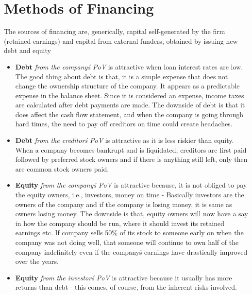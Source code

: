 \section{Methods of Financing}
The sources of financing are, generically, capital self-generated by the firm (retained earnings) and capital from external funders, obtained by issuing new debt and equity
	\begin{itemize}
	\item \textbf{Debt} \textit{from the company\'s PoV} is attractive when loan interest rates are low. The good thing about debt is that, it is a simple expense that does not change the ownership structure of the company. It appears as a predictable expense in the balance sheet. Since it is considered an expense, income taxes are calculated after debt payments are made. The downside of debt is that it does affect the cash flow statement, and when the company is going through hard times, the need to pay off creditors on time could create headaches. 
	\item \textbf{Debt} \textit{from the creditor\'s PoV} is attractive as it is less riskier than equity. When a company becomes bankrupt and is liquidated, creditors are first paid followed by preferred stock owners and if there is anything still left, only then are common stock owners paid. 
	\item \textbf{Equity} \textit{from the company\'s PoV} is attractive because, it is not obliged to pay the equity owners, i.e., investors, money on time - Basically investors are the owners of the company and if the company is losing money, it is same as owners losing money. The downside is that, equity owners will now have a say in how the company should be run, where it should invest its retained earnings etc. If company sells 50\% of its stock to someone early on when the company was not doing well, that someone will continue to own half of the company indefinitely even if the company\'s earnings have drastically improved over the years.
	\item \textbf{Equity} \textit{from the investor\'s PoV} is attractive because it usually has more returns than debt - this comes, of course, from the inherent risks involved. 
	\end{itemize}	


